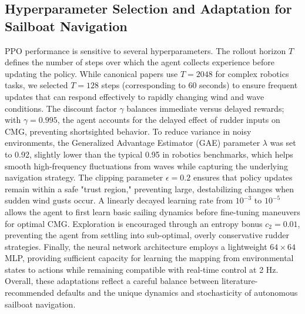 \subsection{Hyperparameter Selection and Adaptation for Sailboat Navigation}
\label{sec:hyp}
\justify PPO performance is sensitive to several hyperparameters. The rollout horizon $T$ defines the number of steps over which the agent collects experience before updating the policy. While canonical papers use $T=2048$ for complex robotics tasks, we selected $T=128$ steps (corresponding to 60 seconds) to ensure frequent updates that can respond effectively to rapidly changing wind and wave conditions. The discount factor $\gamma$ balances immediate versus delayed rewards; with $\gamma=0.995$, the agent accounts for the delayed effect of rudder inputs on CMG, preventing shortsighted behavior. To reduce variance in noisy environments, the Generalized Advantage Estimator (GAE) parameter $\lambda$ was set to 0.92, slightly lower than the typical 0.95 in robotics benchmarks, which helps smooth high-frequency fluctuations from waves while capturing the underlying navigation strategy. The clipping parameter $\epsilon=0.2$ ensures that policy updates remain within a safe "trust region," preventing large, destabilizing changes when sudden wind gusts occur. A linearly decayed learning rate from $10^{-3}$ to $10^{-5}$ allows the agent to first learn basic sailing dynamics before fine-tuning maneuvers for optimal CMG. Exploration is encouraged through an entropy bonus $c_2 = 0.01$, preventing the agent from settling into sub-optimal, overly conservative rudder strategies. Finally, the neural network architecture employs a lightweight $64 \times 64$ MLP, providing sufficient capacity for learning the mapping from environmental states to actions while remaining compatible with real-time control at 2 Hz. Overall, these adaptations reflect a careful balance between literature-recommended defaults and the unique dynamics and stochasticity of autonomous sailboat navigation.
